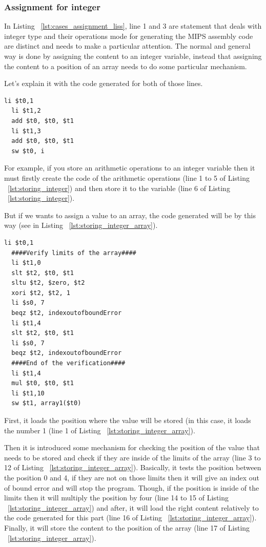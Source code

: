 \documentclass[
  oneside,
  11pt, a4paper,
  footinclude=true,
  headinclude=true,
  cleardoublepage=empty
]{scrbook}
\begin{document}
\subsubsection{Assignment for integer}

In Listing ~\ref{lst:cases_assignment_liss}, line 1 and 3 are statement that deals with integer type and their operations mode for generating the MIPS assembly code are distinct and needs to make a particular attention. The normal and general way is done by assigning the content to an integer variable, instead that assigning the content to a position of an array needs to do some particular mechanism.

Let's explain it with the code generated for both of those lines.

\begin{lstlisting}[caption={Code generated for line 1 in Listing ~\ref{lst:cases_assignment_liss}},label={lst:storing_integer}]
  li $t0,1		
  li $t1,2		
  add $t0, $t0, $t1	
  li $t1,3		
  add $t0, $t0, $t1	
  sw $t0, i		
\end{lstlisting}

For example, if you store an arithmetic operations to an integer variable then it must firstly create the code of the arithmetic operations (line 1 to 5 of Listing ~\ref{lst:storing_integer}) and then store it to the variable (line 6 of Listing ~\ref{lst:storing_integer}).

But if we wants to assign a value to an array, the code generated will be by this way (see in Listing ~\ref{lst:storing_integer_array}).

\begin{lstlisting}[caption={Code generated for line 3 in Listing ~\ref{lst:cases_assignment_liss}},label={lst:storing_integer_array}]
  li $t0,1		
  ####Verify limits of the array####
  li $t1,0		
  slt $t2, $t0, $t1	
  sltu $t2, $zero, $t2	
  xori $t2, $t2, 1	
  li $s0, 7	
  beqz $t2, indexoutofboundError	
  li $t1,4		
  slt $t2, $t0, $t1	
  li $s0, 7	
  beqz $t2, indexoutofboundError	
  ####End of the verification####
  li $t1,4		
  mul $t0, $t0, $t1	
  li $t1,10		
  sw $t1, array1($t0)		
\end{lstlisting}

First, it loads the position where the value will be stored (in this case, it loads the number 1 (line 1 of Listing ~\ref{lst:storing_integer_array}).

Then it is introduced some mechanism for checking the position of the value that needs to be stored and check if they are inside of the limits of the array (line 3 to 12 of Listing ~\ref{lst:storing_integer_array}). Basically, it tests the position between the position 0 and 4, if they are not on those limits then it will give an index out of bound error and will stop the program.
Though, if the position is inside of the limits then it will multiply the position by four (line 14 to 15 of Listing ~\ref{lst:storing_integer_array}) and after, it will load the right content relatively to the code generated for this part (line 16 of Listing ~\ref{lst:storing_integer_array}). Finally, it will store the content to the position of the array (line 17 of Listing ~\ref{lst:storing_integer_array}).
\end{document}
